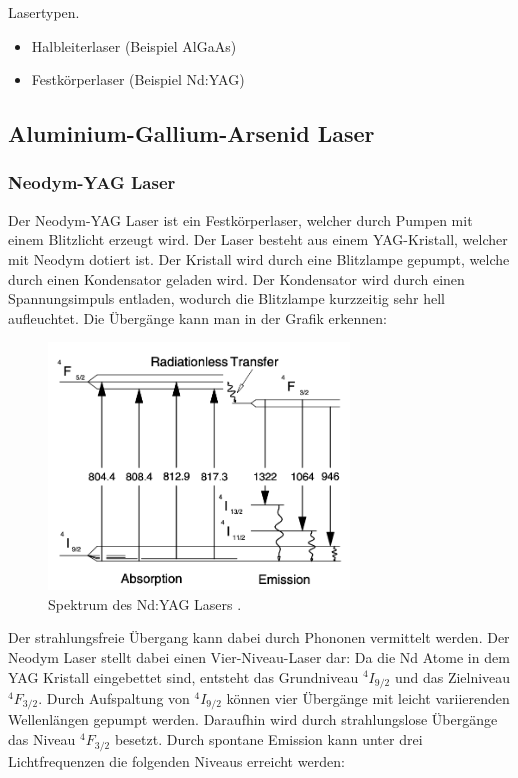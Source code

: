\documentclass{subfiles}
\begin{document}
    \begin{Frage}
        Lasertypen.
        \begin{itemize}
            \item Halbleiterlaser (Beispiel AlGaAs)
            \item Festkörperlaser (Beispiel Nd:YAG)
        \end{itemize}
    \end{Frage}
    \begin{Antwort}
        \subsection*{Aluminium-Gallium-Arsenid Laser}
            
        \subsubsection*{Neodym-YAG Laser}
            Der Neodym-YAG Laser ist ein Festkörperlaser, welcher durch Pumpen mit einem Blitzlicht erzeugt wird. Der Laser besteht aus einem YAG-Kristall, welcher mit Neodym dotiert ist. Der Kristall wird durch eine Blitzlampe gepumpt, welche durch einen Kondensator geladen wird. Der Kondensator wird durch einen Spannungsimpuls entladen, wodurch die Blitzlampe kurzzeitig sehr hell aufleuchtet. Die Übergänge kann man in der Grafik erkennen:
            \begin{figure}
                \centering
                \includegraphics[width=8cm]{Bilddateien/NdYAGSpektrum.png}
                \caption{Spektrum des Nd:YAG Lasers \cite{exp8-paper}.}
                \label{fig:NdYAGSpektrum}
            \end{figure}
            Der strahlungsfreie Übergang kann dabei durch Phononen vermittelt werden. Der Neodym Laser stellt dabei einen Vier-Niveau-Laser dar: Da die Nd Atome in dem YAG Kristall eingebettet sind, entsteht das Grundniveau $^4I_{9/2}$ und das Zielniveau $^4F_{3/2}$. Durch Aufspaltung von $^4I_{9/2}$ können vier Übergänge mit leicht variierenden Wellenlängen gepumpt werden. Daraufhin wird durch strahlungslose Übergänge das Niveau $^4F_{3/2}$ besetzt. Durch spontane Emission kann unter drei Lichtfrequenzen die folgenden Niveaus erreicht werden:

\end{Antwort}
\end{document}
